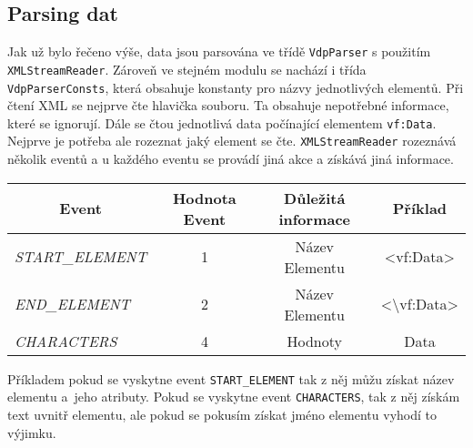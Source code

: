 \subsection{Parsing dat}
Jak už bylo řečeno výše, data jsou parsována ve třídě \texttt{VdpParser} s použitím \texttt{XMLStreamReader}.
Zároveň ve stejném modulu se nachází i třída \texttt{VdpParserConsts}, která obsahuje konstanty pro názvy jednotlivých elementů.
Při čtení XML se nejprve čte hlavička souboru. Ta obsahuje nepotřebné informace, které se ignorují.
Dále se čtou jednotlivá data počínající elementem \texttt{vf:Data}.
Nejprve je potřeba ale rozeznat jaký element se čte.
\texttt{XMLStreamReader} rozeznává několik eventů a u každého eventu se provádí jiná akce a získává jiná informace.
\begin{table}[!h]
    \begin{tabular}{|l|c|c|c|}
    \hline
    \multicolumn{1}{|c|}{\textbf{Event}} & \textbf{Hodnota Event} & \textbf{Důležitá informace} & \textbf{Příklad}                                 \\ \hline
    \textit{START\_ELEMENT}              & 1                      & Název Elementu              & \textless{}vf:Data\textgreater{}                 \\ \hline
    \textit{END\_ELEMENT}                & 2                      & Název Elementu              & \textless{}\textbackslash{}vf:Data\textgreater{} \\ \hline
    \textit{CHARACTERS}                  & 4                      & Hodnoty                     & Data                                             \\ \hline
    \end{tabular}
\end{table}

Příkladem pokud se vyskytne event \texttt{START\_ELEMENT} tak z něj můžu získat název elementu a~jeho atributy.
Pokud se vyskytne event \texttt{CHARACTERS}, tak z něj získám text uvnitř elementu, ale pokud se pokusím získat jméno elementu vyhodí to výjimku.

